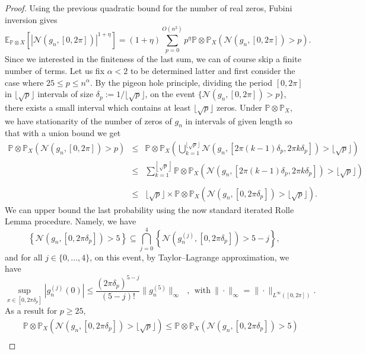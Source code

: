 \documentclass{svproc}
\newcommand{\Prob}{\mathbb{P}}
\newcommand \Esp {\mathbb{E}}
\begin{document}
\begin{proof}
Using the previous quadratic bound for the number of real zeros, Fubini inversion gives
\[
\Esp_{\Prob \otimes X} \left[\left|\mathcal{N}(g_n,[0,2\pi]) \right|^{1+\eta}\right]=(1+\eta)\sum_{p=0}^{O(n^{2})} p^{\eta} \Prob\otimes \Prob_X\left(\mathcal{N}(g_n,[0,2\pi])>p\right).
\]
Since we interested in the finiteness of the last sum, we can of course skip a finite number of terms. Let us fix $\alpha<2$ to be determined latter and first consider the case where $25 \leq p \leq n^{\alpha}$. By the pigeon hole principle, dividing the period $[0,2\pi]$ in $\lfloor \sqrt{p}\rfloor $ intervals of size $\delta_p:=1/\lfloor \sqrt{p}\rfloor$, on the event $\{ \mathcal{N}(g_n,[0,2\pi])>p\}$, there exists a small interval which contains at least $\lfloor \sqrt{p}\rfloor$ zeros. Under $\Prob\otimes\Prob_X$, we have stationarity of the number of zeros of $g_n$ in intervals of given length so that with a union bound we get
\begin{eqnarray*}
\Prob\otimes\Prob_X (\mathcal{N}(g_n,[0,2\pi])>p) & \leq & \Prob \otimes\Prob_X\left( \bigcup_{k=1}^{\lfloor \sqrt{p}\rfloor}\mathcal{N}\left(g_n,\left[2\pi (k-1)\delta_p, 2\pi k \delta_p\right ]\right)> \lfloor \sqrt{p}\rfloor \right) \\
&\leq &\sum_{k=1}^{\left\lfloor \sqrt{p} \right\rfloor}     \Prob \otimes\Prob_X\left(    \mathcal{N}\left(g_n,\left[2\pi (k-1)\delta_p, 2\pi k \delta_p \right ]\right)> \lfloor \sqrt{p}\rfloor \right) \\
\\
& \leq & \lfloor \sqrt{p}\rfloor \times \Prob \otimes\Prob_X\left(    \mathcal{N}\left(g_n,\left[0,  2\pi \delta_p \right ]\right)> \lfloor \sqrt{p}\rfloor \right).
\end{eqnarray*} 
We can upper bound the last probability using the now standard iterated Rolle Lemma procedure. Namely, we have 
$$\left\{ \mathcal{N}(g_n,[0,2\pi\delta_p])>5\right\} \subseteq \bigcap_{j=0}^{4}\left\{ \mathcal{N}(g_n^{(j)},[0,2\pi\delta_p])>5-j\right\},$$
and for all $j \in \{0, \dots, 4\}$, on this event, by Taylor--Lagrange approximation, we have
$$\sup_{x \in [0,2\pi\delta_p]}|g_n^{(j)}(0)| \leq \frac{(2\pi \delta_p)^{5-j}}{(5-j)!}\|g_n^{(5)}\|_{\infty}~~~,~~\text{with}~\|\cdot\|_{\infty}=\|\cdot\|_{L^{\infty}([0,2\pi])}.$$
As a result for $p \geq 25$, 
\begin{eqnarray*}
& & \Prob \otimes \Prob_X\left(\mathcal{N}(g_n,[0,2\pi\delta_p])>\lfloor \sqrt{p} \rfloor\right) \leq \Prob \otimes \Prob_X\left(  \mathcal{N}(g_n,[0,2\pi\delta_p])>5\right)  \\

\end{eqnarray*}
\end{proof}
\end{document}
